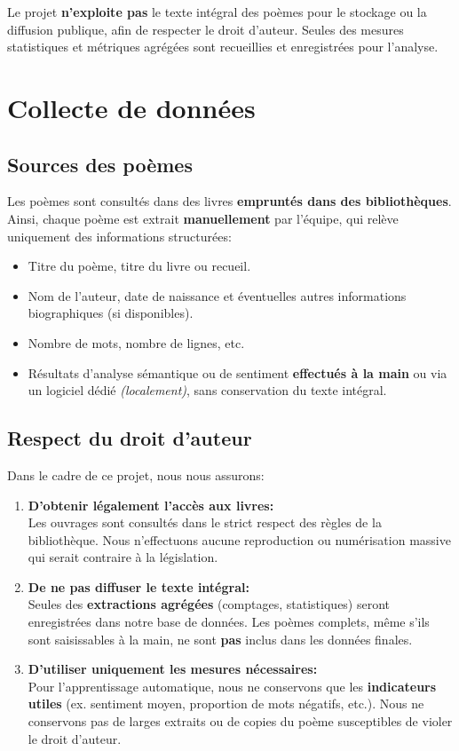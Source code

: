\documentclass[12pt,a4paper]{article}
\begin{document}
Le projet \textbf{n'exploite pas} le texte intégral des poèmes pour le stockage 
ou la diffusion publique, afin de respecter le droit d'auteur. Seules des mesures 
statistiques et métriques agrégées sont recueillies et enregistrées pour l'analyse.

\section{Collecte de données}

\subsection{Sources des poèmes}

Les poèmes sont consultés dans des livres \textbf{empruntés dans des bibliothèques}. 
Ainsi, chaque poème est extrait \textbf{manuellement} par l'équipe, qui relève 
uniquement des informations structurées:
\begin{itemize}
    \item Titre du poème, titre du livre ou recueil.
    \item Nom de l'auteur, date de naissance et éventuelles autres informations 
    biographiques (si disponibles).
    \item Nombre de mots, nombre de lignes, etc.
    \item Résultats d'analyse sémantique ou de sentiment \textbf{effectués à la main} 
    ou via un logiciel dédié \textit{(localement)}, sans conservation du texte intégral.
\end{itemize}

\subsection{Respect du droit d'auteur}

Dans le cadre de ce projet, nous nous assurons:
\begin{enumerate}
    \item \textbf{D'obtenir légalement l'accès aux livres:} \\
    Les ouvrages sont consultés dans le strict respect des règles de la bibliothèque. 
    Nous n'effectuons aucune reproduction ou numérisation massive 
    qui serait contraire à la législation.

    \item \textbf{De ne pas diffuser le texte intégral:} \\
    Seules des \textbf{extractions agrégées} (comptages, statistiques) 
    seront enregistrées dans notre base de données. 
    Les poèmes complets, même s'ils sont saisissables à la main, 
    ne sont \textbf{pas} inclus dans les données finales.

    \item \textbf{D'utiliser uniquement les mesures nécessaires:} \\
    Pour l'apprentissage automatique, nous ne conservons que 
    les \textbf{indicateurs utiles} (ex. sentiment moyen, 
    proportion de mots négatifs, etc.). Nous ne conservons pas 
    de larges extraits ou de copies du poème susceptibles de violer 
    le droit d'auteur.
\end{enumerate}
\end{document}
